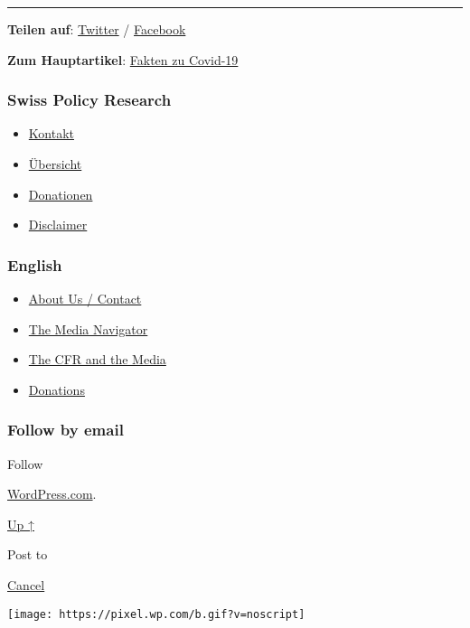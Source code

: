 \begin{center}\rule{0.5\linewidth}{\linethickness}\end{center}

\textbf{Teilen auf}:
\href{https://twitter.com/intent/tweet?url=https://swprs.org/corona-app-ein-eklatanter-betrug/}{Twitter}
/
\href{https://www.facebook.com/share.php?u=https://swprs.org/corona-app-ein-eklatanter-betrug/}{Facebook}

\textbf{Zum Hauptartikel}:
\href{https://swprs.org/covid-19-hinweis-ii/}{Fakten zu Covid-19}

\hypertarget{swiss-policy-research}{%
\subsubsection{Swiss Policy Research}\label{swiss-policy-research}}

\begin{itemize}
\tightlist
\item
  \href{https://swprs.org/kontakt/}{Kontakt}
\item
  \href{https://swprs.org/uebersicht/}{Übersicht}
\item
  \href{https://swprs.org/donationen/}{Donationen}
\item
  \href{https://swprs.org/disclaimer/}{Disclaimer}
\end{itemize}

\hypertarget{english}{%
\subsubsection{English}\label{english}}

\begin{itemize}
\tightlist
\item
  \href{https://swprs.org/contact/}{About Us / Contact}
\item
  \href{https://swprs.org/media-navigator/}{The Media Navigator}
\item
  \href{https://swprs.org/the-american-empire-and-its-media/}{The CFR
  and the Media}
\item
  \href{https://swprs.org/donations/}{Donations}
\end{itemize}

\hypertarget{follow-by-email}{%
\subsubsection{Follow by email}\label{follow-by-email}}

Follow

\href{https://wordpress.com/?ref=footer_custom_com}{WordPress.com}.

\protect\hyperlink{}{Up ↑}

Post to

\protect\hyperlink{}{Cancel}

\texttt{[image: https://pixel.wp.com/b.gif?v=noscript]}
